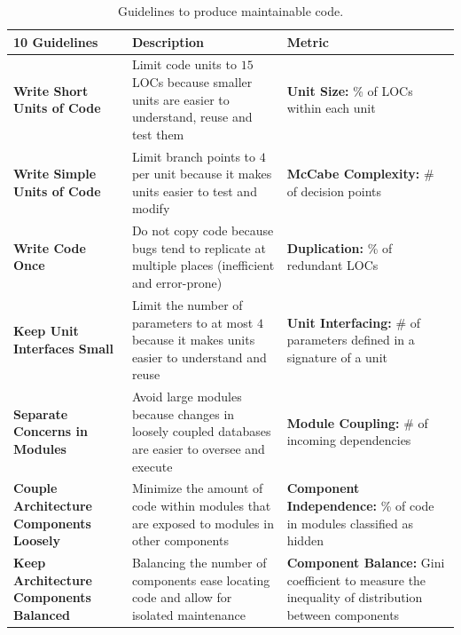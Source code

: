 \documentclass[smallextended]{svjour3}       %
\begin{document}
\begin{table}[h]
\centering
\scriptsize
	\caption{Guidelines to produce maintainable code.}
\begin{tabular}{L{2cm}L{4.5cm}L{4cm}}

\toprule
\textbf{10 Guidelines} & \textbf{Description} & \textbf{Metric}\\
\midrule

\textbf{Write Short Units of Code} & Limit code units to $15$ LOCs because smaller
 units are easier to understand, reuse and test them & \textbf{Unit Size:} \% of 
 LOCs within each unit~\cite{criteria:2017} \\\midrule

\textbf{Write Simple Units of Code} & Limit branch points to $4$ per unit because
it makes units easier to test and modify & \textbf{McCabe Complexity:} \# of decision 
points~\cite{1702388,criteria:2017}\\\midrule

\textbf{Write Code Once} & Do not copy code because bugs tend to replicate at
multiple places (inefficient and error-prone) & \textbf{Duplication:} \% of redundant 
LOCs~\cite{criteria:2017}\\\midrule

\textbf{Keep Unit Interfaces Small} & Limit the number of parameters to at most
$4$ because it makes units easier to understand and reuse & \textbf{Unit Interfacing:} 
\# of parameters defined in a signature of a unit~\cite{criteria:2017} \\\midrule

\textbf{Separate Concerns in Modules} & Avoid large modules because changes in
loosely coupled databases are easier to oversee and execute & \textbf{Module Coupling:} \# of
incoming dependencies~\cite{criteria:2017} \\\midrule

\textbf{Couple Architecture Components Loosely} & Minimize the amount of code
within modules that are exposed to modules in other components & \textbf{Component Independence:} 
\% of code in modules classified as hidden~\cite{criteria:2017}\\\midrule

\textbf{Keep Architecture Components Balanced} & Balancing the number of
components ease locating code and allow for isolated maintenance & \textbf{Component Balance:} 
Gini coefficient to measure the inequality of distribution between components~\cite{criteria:2017} \\\midrule


\end{tabular}
\end{table}
\end{document}
